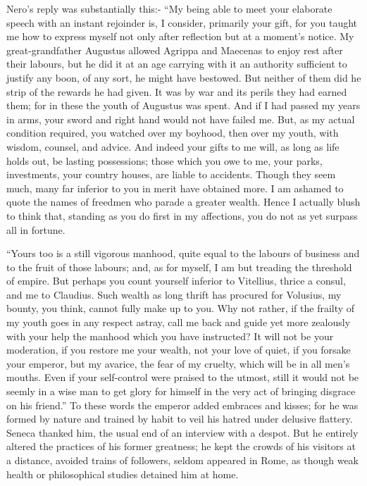 
Nero's reply was substantially this:- ``My being able to meet your elaborate speech with an instant rejoinder is, I consider, primarily your gift, for you taught me how to express myself not only after reflection but at a moment's notice. My great-grandfather Augustus allowed Agrippa and Maecenas to enjoy rest after their labours, but he did it at an age carrying with it an authority sufficient to justify any boon, of any sort, he might have bestowed. But neither of them did he strip of the rewards he had given. It was by war and its perils they had earned them; for in these the youth of Augustus was spent. And if I had passed my years in arms, your sword and right hand would not have failed me. But, as my actual condition required, you watched over my boyhood, then over my youth, with wisdom, counsel, and advice. And indeed your gifts to me will, as long as life holds out, be lasting possessions; those which you owe to me, your parks, investments, your country houses, are liable to accidents. Though they seem much, many far inferior to you in merit have obtained more. I am ashamed to quote the names of freedmen who parade a greater wealth. Hence I actually blush to think that, standing as you do first in my affections, you do not as yet surpass all in fortune.


``Yours too is a still vigorous manhood, quite equal to the labours of business and to the fruit of those labours; and, as for myself, I am but treading the threshold of empire. But perhaps you count yourself inferior to Vitellius, thrice a consul, and me to Claudius. Such wealth as long thrift has procured for Volusius, my bounty, you think, cannot fully make up to you. Why not rather, if the frailty of my youth goes in any respect astray, call me back and guide yet more zealously with your help the manhood which you have instructed? It will not be your moderation, if you restore me your wealth, not your love of quiet, if you forsake your emperor, but my avarice, the fear of my cruelty, which will be in all men's mouths. Even if your self-control were praised to the utmost, still it would not be seemly in a wise man to get glory for himself in the very act of bringing disgrace on his friend.'' To these words the emperor added embraces and kisses; for he was formed by nature and trained by habit to veil his hatred under delusive flattery. Seneca thanked him, the usual end of an interview with a despot. But he entirely altered the practices of his former greatness; he kept the crowds of his visitors at a distance, avoided trains of followers, seldom appeared in Rome, as though weak health or philosophical studies detained him at home.

